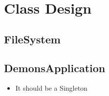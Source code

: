 

\chapter{Class Design}

\section{FileSystem}

\section{DemonsApplication}
\begin{itemize}
	\item It should be a Singleton
\end{itemize}